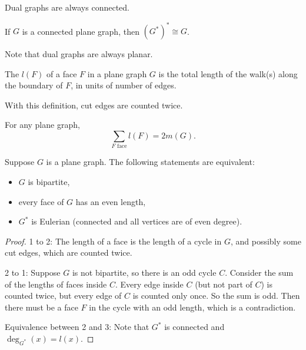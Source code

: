 \begin{proposition}
  Dual graphs are always connected.
\end{proposition}

\begin{proposition}
  If $G$ is a connected plane graph, then $(G^*)^* \cong G$.
\end{proposition}

\begin{remark}
  Note that dual graphs are always planar.
\end{remark}

\begin{definition}
  The  $l(F)$ of a face $F$ in a plane graph $G$ is the total
  length of the walk(s) along the boundary of $F$, in units of number of edges.
\end{definition}

\begin{remark}
  With this definition, cut edges are counted twice.
\end{remark}

\begin{remark}
  For any plane graph,
  \[
	\sum_{\text{$F$ face}} l(F) = 2 m(G).
  \]
\end{remark}

\begin{theorem}
  Suppose $G$ is a plane graph.
  The following statements are equivalent:
  \begin{itemize}
  \item $G$ is bipartite,
  \item every face of $G$ has an even length,
  \item $G^*$ is Eulerian (connected and all vertices are of even degree).
  \end{itemize}
\end{theorem}

\begin{proof}
  1 to 2:
  The length of a face is the length of a cycle in $G$, and possibly some cut
  edges, which are counted twice.

  2 to 1:
  Suppose $G$ is not bipartite, so there is an odd cycle $C$.
  Consider the sum of the lengths of faces inside $C$.
  Every edge inside $C$ (but not part of $C$) is counted twice, but every edge
  of $C$ is counted only once.
  So the sum is odd.
  Then there must be a face $F$ in the cycle with an odd length, which is a
  contradiction.

  Equivalence between 2 and 3:
  Note that $G^*$ is connected and $\deg_{G^*}(x) = l(x)$.
\end{proof}

